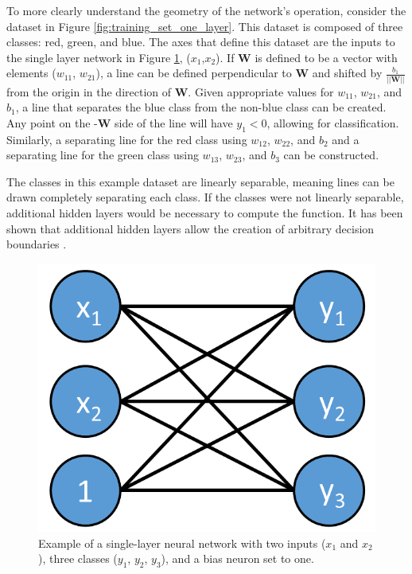 To more clearly understand the geometry of the network's operation, consider the dataset in Figure \ref{fig:training_set_one_layer}. This dataset is composed of three classes: red, green, and blue. The axes that define this dataset are the inputs to the single layer network in Figure \ref{fig:one_layer_net}, ($x_1$,$x_2$). If $\mathbf{W}$ is defined to be a vector with elements ($w_{11}$, $w_{21}$), a line can be defined perpendicular to $\mathbf{W}$ and shifted by $\frac{b_1}{||\mathbf{W}||}$ from the origin in the direction of $\mathbf{W}$. Given appropriate values for $w_{11}$, $w_{21}$, and $b_1$, a line that separates the blue class from the non-blue class can be created. Any point on the -$\mathbf{W}$ side of the line will have $y_1 < 0$, allowing for classification. Similarly, a separating line for the red class using $w_{12}$, $w_{22}$, and $b_2$ and a separating line for the green class using $w_{13}$, $w_{23}$, and $b_3$ can be constructed. 

The classes in this example dataset are linearly separable, meaning lines can be drawn completely separating each class. If the classes were not linearly separable, additional hidden layers would be necessary to compute the function. It has been shown that additional hidden layers allow the creation of arbitrary decision boundaries \cite{Hornik1991}. 
%
\begin{figure}[H]
	\centering
	\includegraphics[width=0.45\linewidth]{images/One_layer_net_v31}
	\caption{Example of a single-layer neural network with two inputs ($x_{1}$ and $x_{2}$), three classes ($y_{1}$, $y_{2}$, $y_{3}$), and a bias neuron set to one.}
	\label{fig:one_layer_net}
\end{figure}




